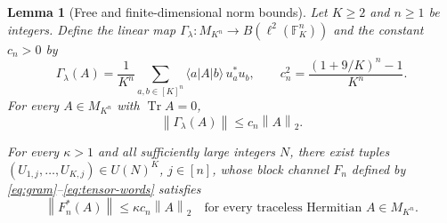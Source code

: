 \documentclass[11pt]{article}
\numberwithin{equation}{section}
\newtheorem{lemma}[theorem]{Lemma}
\theoremstyle{boldremark}\newtheorem{remark}[theorem]{Remark}
\DeclareMathOperator{\Tr}{Tr}
\newcommand{\F}{\mathbb F}
\newcommand{\M}{M}
\newcommand{\norm}[1]{\left\lVert #1\right\rVert}
\newcommand{\ket}[1]{\lvert #1\rangle}
\newcommand{\bra}[1]{\langle #1\rvert}
\begin{document}
\begin{lemma}[Free and finite-dimensional norm bounds]\label{lem:cy}
Let $K\ge2$ and $n\ge1$ be integers.
Define the linear map
$\Gamma_\lambda:\M_{K^n}\to B(\ell^2(\F_K^n))$ and the constant $c_n>0$ by
\begin{equation}
 \Gamma_\lambda(A)=\frac1{K^n}\sum_{a,b\in[K]^n}\bra a A\ket b\,u_a^*u_b,
 \qquad c_n^2=\frac{(1+9/K)^n-1}{K^n}.
 \label{eq:gamma-free}
\end{equation}
For every $A\in\M_{K^n}$ with $\Tr A=0$,
\begin{equation}
 \norm{\Gamma_\lambda(A)}\le c_n\norm A_2.
 \label{eq:cy}
\end{equation}

For every $\kappa>1$ and all sufficiently large integers $N$, there
exist tuples $(U_{1,j},\ldots,U_{K,j})\in U(N)^K$, $j\in[n]$, whose
block channel $F_n$ defined by \eqref{eq:gram}--\eqref{eq:tensor-words}
satisfies
\begin{equation}
 \norm{F_n^*(A)}\le\kappa c_n\norm A_2
 \quad\text{for every traceless Hermitian }A\in\M_{K^n}.
 \label{eq:norm-certificate}
\end{equation}
\end{lemma}
\end{document}
